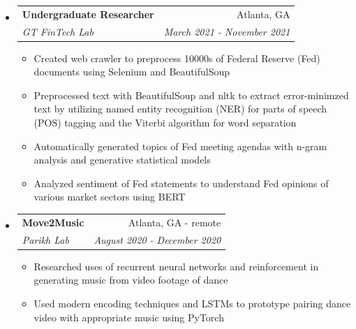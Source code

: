\documentclass[letterpaper,10pt]{article}
\makeatletter
\newcommand{\resitem}[1]{\item #1 \vspace{-3.5pt}}  %
\newcommand{\ressubheading}[4]{
\begin{tabular*}{7.0in}{l@{\extracolsep{\fill}}r}  
		\textbf{#1} & #2 \\
		\textit{#3} & \textit{#4} \\
\end{tabular*}\vspace{-6pt}}  %
\makeatother
\begin{document}
\begin{itemize}
\begin{itemize}
    \end{itemize}
\item
    \ressubheading{Undergraduate Researcher}{Atlanta, GA}{GT FinTech Lab}{March 2021 - November 2021}
    \begin{itemize}
        \resitem{Created web crawler to preprocess 10000s of Federal Reserve (Fed) documents using Selenium and BeautifulSoup}
        \resitem{Preprocessed text with BeautifulSoup and nltk to extract error-minimzed text by utilizing named entity recognition (NER) for parts of speech (POS) tagging and the Viterbi algorithm for word separation}
        \resitem{Automatically generated topics of Fed meeting agendas with n-gram analysis and generative statistical models}
        \resitem{Analyzed sentiment of Fed statements to understand Fed opinions of various market sectors using BERT}
    \end{itemize}
\item
    \ressubheading{Move2Music}{Atlanta, GA - remote}{Parikh Lab}{August 2020 - December 2020}
    \begin{itemize}
        \resitem{Researched uses of recurrent neural networks and reinforcement in generating music from video footage of dance}
        \resitem{Used modern encoding techniques and LSTMs to prototype pairing dance video with appropriate music using PyTorch}
    \end{itemize}

\end{itemize}
\end{document}
